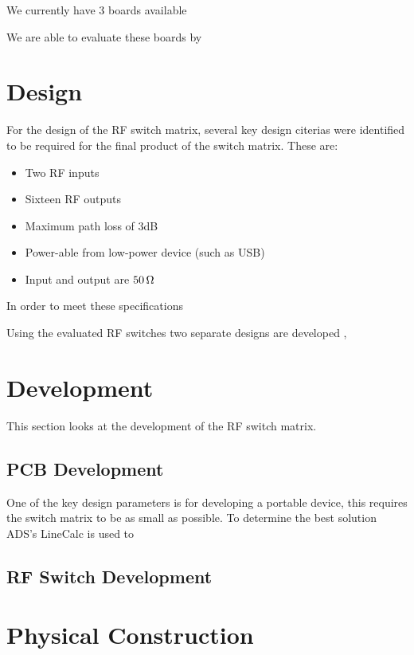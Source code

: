 \documentclass[12pt,openany,a4paper]{book}
\newcommand{\ohm}	{\ensuremath{\rm\,\Omega}}
\begin{document}
We currently have $3$ boards available 

We are able to evaluate these boards by 






\section{Design}
For the design of the RF switch matrix, several key design citerias were identified to be required for the final product of the switch matrix. These are:
\begin{itemize}
	\setlength\itemsep{-0.5em}
	\item Two RF inputs
	\item Sixteen RF outputs
	\item Maximum path loss of $3$dB
	\item Power-able from low-power device (such as USB)
	\item Input and output are $50\ohm$
\end{itemize}
In order to meet these specifications 

Using the evaluated RF switches two separate designs are developed , 







\section{Development}
This section looks at the development of the RF switch matrix.
\subsection{PCB Development}


One of the key design parameters is for developing a portable device, this requires the switch matrix to be as small as possible. To determine the best solution ADS's LineCalc is used to %



\subsection{RF Switch Development}





\section{Physical Construction}
\end{document}
